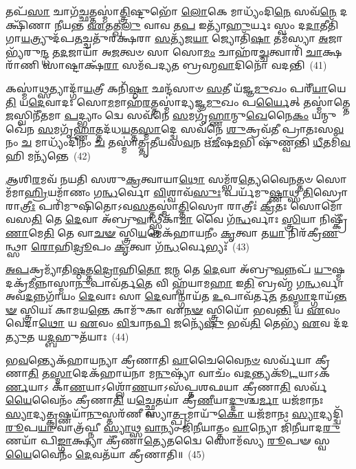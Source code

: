𑌤𑌪᳴\-\ul{𑌸𑌾} 𑌚𑌾𑌗᳴\-\ul{𑌚𑍍𑌛}\-𑌤𑍍𑌤𑌸𑍍𑌮𑌾॑\-\ul{𑌤𑍍𑌤𑍍𑌰𑌿}\-𑌷𑍍𑌟𑍁𑌭𑍋᳴ \ul{𑌲𑍋}\-𑌕𑍇 𑌮𑌾𑌧𑍍𑌯𑌂᳴𑌦𑌿\-\ul{𑌨𑍇} 𑌸𑌵᳴\-\ul{𑌨𑍇} 𑌦𑌕𑍍𑌷𑌿᳴𑌣𑌾 𑌨𑍀𑌯𑌨𑍍𑌤 \ul{𑌏}\-𑌤𑌤𑍍𑌖\-\ul{𑌲𑍁} 𑌵𑌾𑌵 𑌤\-\ul{𑌪} 𑌇𑌤𑍍𑌯𑌾᳴\-\ul{𑌹𑍁}\-𑌰𑍍𑌯𑌃 𑌸𑍍𑌵𑌂 𑌦\-\ul{𑌦𑌾}\-𑌤𑍀𑌤𑌿᳴ 𑌗𑌾\-\ul{𑌯}\-𑌤𑍍𑌰𑍍𑌯𑍁𑌦᳴𑌪\-\ul{𑌤}\-𑌚𑍍𑌚𑌤𑍁᳴𑌰𑌕𑍍𑌷𑌰𑌾 \ul{𑌸}\-𑌤𑍍𑌯᳴𑌜\-\ul{𑌯𑌾} 𑌜𑍍𑌯𑍋𑌤𑌿᳴\-\ul{𑌷𑌾} 𑌤𑌮᳴𑌸𑍍𑌯𑌾 \ul{𑌅}\-𑌜𑌾𑌭𑍍𑌯᳴𑌰𑍁\-\ul{𑌨𑍍𑌦𑍍𑌧} 𑌤\-\ul{𑌦}\-𑌜𑌾𑌯𑌾᳴ 𑌅\-\ul{𑌜}\-𑌤𑍍𑌵𑍞 𑌸𑌾 𑌸𑍋\-\ul{𑌮𑌂} 𑌚𑌾𑌹᳴𑌰\-\ul{𑌚𑍍𑌚}\-𑌤𑍍𑌵𑌾𑌰𑌿᳴ \ul{𑌚𑌾}\-𑌕𑍍𑌷𑌰𑌾᳴𑌣𑌿 𑌸𑌾𑌷𑍍𑌟𑌾𑌕𑍍𑌷᳴\-\ul{𑌰𑌾} 𑌸𑌮᳴𑌪𑌦𑍍𑌯𑌤 𑌬𑍍𑌰𑌹𑍍𑌮\-\ul{𑌵𑌾}\-𑌦𑌿𑌨𑍋᳴ 𑌵𑌦𑌨𑍍𑌤𑌿~(41)

𑌕𑌸𑍍𑌮𑌾॑\-\ul{𑌥𑍍𑌸}\-𑌤𑍍𑌯𑌾𑌦𑍍𑌗𑌾᳴\-\ul{𑌯}\-𑌤𑍍𑌰𑍀 𑌕𑌨𑌿᳴\-\ul{𑌷𑍍𑌠𑌾} 𑌛𑌨𑍍𑌦᳴𑌸𑌾𑍞 \ul{𑌸}\-𑌤𑍀 𑌯᳴𑌜𑍍𑌞\-\ul{𑌮𑍁}\-𑌖𑌂 𑌪𑌰𑍀᳴\-\ul{𑌯𑌾}\-𑌯𑍇\-\ul{𑌤𑌿} 𑌯\-\ul{𑌦𑍇}\-𑌵𑌾𑌦𑌃 𑌸𑍋\-\ul{𑌮}\-𑌮𑌾𑌹᳴\-\ul{𑌰}\-𑌤𑍍𑌤𑌸𑍍𑌮𑌾॑𑌦𑍍𑌯𑌜𑍍𑌞\-\ul{𑌮𑍁}\-𑌖𑌂 𑌪\-\ul{𑌰𑍍𑌯𑍈}\-𑌤𑍍 𑌤𑌸𑍍𑌮𑌾॑𑌤𑍍𑌤𑍇\-\ul{𑌜}\-𑌸𑍍𑌵𑌿𑌨𑍀᳴𑌤𑌮𑌾 \ul{𑌪}\-𑌦𑍍𑌭𑍍𑌯𑌾𑌂 𑌦𑍍𑌵𑍇 𑌸𑌵᳴𑌨𑍇 \ul{𑌸}\-𑌮𑌗𑍃᳴\-\ul{𑌹𑍍𑌣𑌾}\-𑌨𑍍𑌮𑍁\-\ul{𑌖𑍇}\-𑌨𑍈\-\ul{𑌕𑌂} 𑌯𑌨𑍍𑌮𑍁𑌖𑍇᳴𑌨 \ul{𑌸}\-𑌮𑌗𑍃᳴\-\ul{𑌹𑍍𑌣𑌾}\-𑌤𑍍𑌤𑌦᳴𑌧\-\ul{𑌯}\-𑌤𑍍𑌤\-\ul{𑌸𑍍𑌮𑌾}\-𑌦𑍍𑌦𑍍𑌵𑍇 𑌸𑌵᳴𑌨𑍇 \ul{𑌶𑍁}\-𑌕𑍍𑌰𑌵᳴𑌤𑍀 𑌪𑍍𑌰𑌾𑌤𑌃𑌸\-\ul{𑌵}\-𑌨𑌂 \ul{𑌚} 𑌮𑌾𑌧𑍍𑌯𑌂᳴𑌦𑌿𑌨𑌂 \ul{𑌚} 𑌤𑌸𑍍𑌮𑌾॑𑌤𑍍𑌤𑍃𑌤𑍀𑌯𑌸\-\ul{𑌵}\-𑌨 𑌋᳴\-\ul{𑌜𑍀}\-𑌷\-\ul{𑌮}\-𑌭𑌿 𑌷𑍁᳴𑌣𑍍𑌵𑌨𑍍𑌤𑌿 \ul{𑌧𑍀}\-𑌤𑌮𑌿᳴\-\ul{𑌵} 𑌹𑌿 𑌮𑌨𑍍𑌯᳴𑌨𑍍𑌤𑍇~(42)

\-\ul{𑌆}\-𑌶𑌿\-\ul{𑌰}\-𑌮𑌵᳴ 𑌨𑌯𑌤𑌿 𑌸𑌶𑍁\-\ul{𑌕𑍍𑌰}\-𑌤𑍍𑌵𑌾𑌯𑌾\-\ul{𑌥𑍋} 𑌸𑌮𑍍𑌭᳴𑌰\-\ul{𑌤𑍍𑌯𑍇}\-𑌵𑍈\-\ul{𑌨}\-𑌤𑍍𑌤𑍞 𑌸𑍋𑌮᳴𑌮𑌾\-\ul{𑌹𑍍𑌰𑌿}\-𑌯𑌮𑌾᳴𑌣𑌂 𑌗\-\ul{𑌨𑍍𑌧}\-𑌰𑍍𑌵𑍋 \ul{𑌵𑌿}\-𑌶𑍍𑌵𑌾𑌵᳴\-\ul{𑌸𑍁𑌃} 𑌪𑌰𑍍𑌯᳴𑌮𑍁\-\ul{𑌷𑍍𑌣𑌾}\-𑌥𑍍𑌸 \ul{𑌤𑌿}\-𑌸𑍍𑌰𑍋 𑌰𑌾\-\ul{𑌤𑍍𑌰𑍀𑌃} 𑌪𑌰𑌿᳴𑌮𑍁𑌷𑌿𑌤𑍋\-𑌽𑌵\-\ul{𑌸}\-𑌤𑍍𑌤𑌸𑍍𑌮𑌾॑\-\ul{𑌤𑍍𑌤𑌿}\-𑌸𑍍𑌰𑍋 𑌰𑌾𑌤𑍍𑌰𑍀𑌃॑ \ul{𑌕𑍍𑌰𑍀}\-𑌤𑌃 𑌸𑍋𑌮𑍋᳴ 𑌵𑌸\-\ul{𑌤𑌿} 𑌤𑍇 \ul{𑌦𑍇}\-𑌵𑌾 𑌅᳴𑌬𑍍𑌰𑍁\-\ul{𑌵}\-𑌨𑍍𑌥𑍍𑌸𑍍𑌤𑍍𑌰𑍀𑌕𑌾᳴\-\ul{𑌮𑌾} 𑌵𑍈 𑌗᳴\-\ul{𑌨𑍍𑌧}\-𑌰𑍍𑌵𑌾𑌃 \ul{𑌸𑍍𑌤𑍍𑌰𑌿}\-𑌯𑌾 𑌨𑌿𑌷𑍍𑌕𑍍𑌰𑍀᳴\-\ul{𑌣𑌾}\-𑌮𑍇\-\ul{𑌤𑌿} 𑌤𑍇 𑌵𑌾\-\ul{𑌚}\-\-\ul{𑍟} 𑌸𑍍𑌤𑍍𑌰𑌿\-\ul{𑌯}\-𑌮𑍇𑌕᳴𑌹𑌾𑌯𑌨𑍀𑌂 \ul{𑌕𑍃}\-𑌤𑍍𑌵𑌾 𑌤\-\ul{𑌯𑌾} 𑌨𑌿𑌰᳴𑌕𑍍𑌰𑍀\-\ul{𑌣}\-𑌨𑍍𑌥𑍍𑌸𑌾 \ul{𑌰𑍋}\-𑌹𑌿\-\ul{𑌦𑍍𑌰𑍂}\-𑌪𑌂 \ul{𑌕𑍃}\-𑌤𑍍𑌵𑌾 𑌗᳴\-\ul{𑌨𑍍𑌧}\-𑌰𑍍𑌵𑍇𑌭𑍍𑌯𑌃᳴~(43)

\-\ul{𑌅}\-\-\ul{𑌪}\-𑌕𑍍𑌰𑌮𑍍𑌯𑌾᳴𑌤𑌿\-\ul{𑌷𑍍𑌠}\-𑌤𑍍𑌤\-\ul{𑌦𑍍𑌰𑍋}\-𑌹𑌿\-\ul{𑌤𑍋} 𑌜\-\ul{𑌨𑍍𑌮} 𑌤𑍇 \ul{𑌦𑍇}\-𑌵𑌾 𑌅᳴𑌬𑍍𑌰𑍁\-\ul{𑌵}\-𑌨𑍍𑌨𑌪᳴ \ul{𑌯𑍁}\-𑌷𑍍𑌮𑌦𑌕𑍍𑌰᳴\-\ul{𑌮𑍀}\-𑌨𑍍𑌨𑌾𑌸𑍍𑌮𑌾\-\ul{𑌨𑍁}\-𑌪𑌾𑌵᳴𑌰𑍍𑌤\-\ul{𑌤𑍇} 𑌵𑌿 𑌹𑍍𑌵᳴𑌯𑌾𑌮\-\ul{𑌹𑌾} 𑌇\-\ul{𑌤𑌿} 𑌬𑍍𑌰𑌹𑍍𑌮᳴ 𑌗\-\ul{𑌨𑍍𑌧}\-𑌰𑍍𑌵𑌾 𑌅𑌵᳴\-\ul{𑌦}\-𑌨𑍍𑌨𑌗𑌾᳴𑌯𑌂 \ul{𑌦𑍇}\-𑌵𑌾𑌃 𑌸𑌾 \ul{𑌦𑍇}\-𑌵𑌾𑌨𑍍𑌗𑌾𑌯᳴𑌤 \ul{𑌉}\-𑌪𑌾𑌵᳴𑌰𑍍𑌤\-\ul{𑌤} 𑌤\-\ul{𑌸𑍍𑌮𑌾}\-𑌦𑍍𑌗𑌾𑌯᳴\-\ul{𑌨𑍍𑌤}\-\-\ul{𑍟} 𑌸𑍍𑌤𑍍𑌰𑌿𑌯𑌃᳴ 𑌕𑌾𑌮𑌯\-\ul{𑌨𑍍𑌤𑍇} 𑌕𑌾𑌮𑍁᳴𑌕𑌾 𑌏\-\ul{𑌨}\-\-\ul{𑍟} 𑌸𑍍𑌤𑍍𑌰𑌿𑌯𑍋᳴ 𑌭𑌵\-\ul{𑌨𑍍𑌤𑌿} 𑌯 \ul{𑌏}\-𑌵𑌂 𑌵𑍇𑌦𑌾\-\ul{𑌥𑍋} 𑌯 \ul{𑌏}\-𑌵𑌂 \ul{𑌵𑌿}\-𑌦𑍍𑌵𑌾𑌨\-\ul{𑌪𑌿} 𑌜𑌨𑍍𑌯𑍇᳴\-\ul{𑌷𑍁} 𑌭𑌵᳴\-\ul{𑌤𑌿} 𑌤𑍇𑌭𑍍𑌯᳴ \ul{𑌏}\-𑌵 𑌦᳴𑌦\-\ul{𑌤𑍍𑌯𑍁}\-𑌤 𑌯\-\ul{𑌦𑍍𑌬}\-𑌹𑍁𑌤᳴𑌯𑌾𑌃~(44)

𑌭\-\ul{𑌵}\-𑌨𑍍𑌤𑍍𑌯𑍇𑌕᳴𑌹𑌾𑌯𑌨𑍍𑌯𑌾 𑌕𑍍𑌰𑍀𑌣𑌾𑌤𑌿 \ul{𑌵𑌾}\-𑌚𑍈𑌵𑍈\-\ul{𑌨}\-\-\ul{𑍞} 𑌸𑌰𑍍𑌵᳴𑌯𑌾 𑌕𑍍𑌰𑍀𑌣𑌾\-\ul{𑌤𑌿} 𑌤\-\ul{𑌸𑍍𑌮𑌾}\-𑌦𑍇𑌕᳴𑌹𑌾𑌯𑌨𑌾 𑌮\-\ul{𑌨𑍁}\-𑌷𑍍𑌯𑌾᳴ 𑌵𑌾𑌚𑌂᳴ 𑌵\-\ul{𑌦}\-𑌨𑍍𑌤𑍍𑌯𑌕𑍂᳴\-\ul{𑌟}\-𑌯𑌾\-𑌽𑌕᳴\-\ul{𑌰𑍍𑌣}\-𑌯𑌾\-𑌽 𑌕𑌾᳴\-\ul{𑌣}\-𑌯𑌾\-𑌽𑌶𑍍𑌲𑍋᳴\-\ul{𑌣}\-𑌯𑌾\-𑌽𑌸᳴𑌪𑍍𑌤𑌶𑌫𑌯𑌾 𑌕𑍍𑌰𑍀𑌣𑌾\-\ul{𑌤𑌿} 𑌸𑌰𑍍𑌵᳴\-\ul{𑌯𑍈}\-𑌵𑍈𑌨𑌂᳴ 𑌕𑍍𑌰𑍀𑌣𑌾\-\ul{𑌤𑌿} 𑌯\-\ul{𑌚𑍍𑌛𑍍𑌵𑍇}\-𑌤𑌯𑌾॑ 𑌕𑍍𑌰𑍀\-\ul{𑌣𑍀}\-𑌯𑌾\-\ul{𑌦𑍍𑌦𑍁}\-𑌶𑍍𑌚\-\ul{𑌰𑍍𑌮𑌾} 𑌯𑌜᳴𑌮𑌾𑌨𑌃 \ul{𑌸𑍍𑌯𑌾}\-𑌦𑍍𑌯\-\ul{𑌤𑍍𑌕𑍃}\-𑌷𑍍𑌣𑌯𑌾᳴\-\ul{𑌨𑍁}\-𑌸𑍍𑌤𑌰᳴𑌣𑍀 𑌸𑍍𑌯𑌾\-\ul{𑌤𑍍𑌪𑍍𑌰}\-𑌮𑌾𑌯𑍁᳴\-\ul{𑌕𑍋} 𑌯𑌜᳴𑌮𑌾𑌨𑌃 \ul{𑌸𑍍𑌯𑌾}\-𑌦𑍍𑌯𑌦𑍍𑌦𑍍𑌵𑌿᳴\-\ul{𑌰𑍂}\-𑌪\-\ul{𑌯𑌾} 𑌵𑌾𑌤𑍍𑌰᳴𑌘𑍍𑌨𑍀 \ul{𑌸𑍍𑌯𑌾}\-𑌥𑍍𑌸 \ul{𑌵𑌾}\-𑌨𑍍𑌯𑌂 𑌜𑌿᳴\-\ul{𑌨𑍀}\-𑌯𑌾𑌤𑍍𑌤𑌂 \ul{𑌵𑌾}\-𑌨𑍍𑌯𑍋 𑌜𑌿᳴𑌨𑍀𑌯𑌾𑌦\-\ul{𑌰𑍁}\-𑌣𑌯𑌾᳴ 𑌪𑌿\-\ul{𑌙𑍍𑌗𑌾}\-𑌕𑍍𑌷𑍍𑌯𑌾 𑌕𑍍𑌰𑍀᳴𑌣𑌾\-\ul{𑌤𑍍𑌯𑍇}\-𑌤𑌦𑍍𑌵𑍈 𑌸𑍋𑌮᳴𑌸𑍍𑌯 \ul{𑌰𑍂}\-𑌪𑍟 𑌸𑍍𑌵\-\ul{𑌯𑍈}\-𑌵𑍈𑌨𑌂᳴ \ul{𑌦𑍇}\-𑌵𑌤᳴𑌯𑌾 𑌕𑍍𑌰𑍀𑌣𑌾𑌤𑌿॥~(45)

